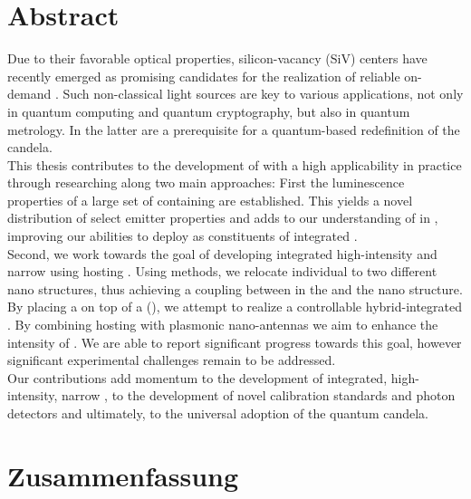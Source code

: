 
\null\vfill

\section*{Abstract}

	Due to their favorable optical properties, silicon-vacancy (SiV) centers have recently emerged as promising candidates for the realization of reliable on-demand \spss. Such non-classical light sources are key to various applications, not only in quantum computing and quantum cryptography, but also in quantum metrology. In the latter \spss are a prerequisite for a quantum-based redefinition of the candela.
	\\
	This thesis contributes to the development of \spss with a high applicability in practice through researching \sivs along two main approaches: First the luminescence properties of a large set of \nds containing \sivs are established. This yields a novel distribution of select emitter properties and adds to our understanding of \sivs in \nds, improving our abilities to deploy \sivs as constituents of integrated \spss.
	\\
	Second, we work towards the goal of developing integrated high-intensity and narrow \lw \spss using \nds hosting \sivs. Using \pp methods, we relocate individual \nds to two different nano structures, thus achieving a coupling between \sivs in the \nd and the nano structure. By placing a \nd on top of a \vcsel (\VCSEL), we attempt to realize a controllable hybrid-integrated \sps. By combining \nds hosting \sivs with plasmonic nano-antennas we aim to enhance the \pl intensity of \sivs. We are able to report significant progress towards this goal, however significant experimental challenges remain to be addressed.
	\\
	Our contributions add momentum to the development of integrated, high-intensity, narrow \lw \spss, to the development of novel calibration standards and photon detectors and ultimately, to the universal adoption of the quantum candela.




\vfill

\newpage

\null\vfill

\section*{Zusammenfassung}

